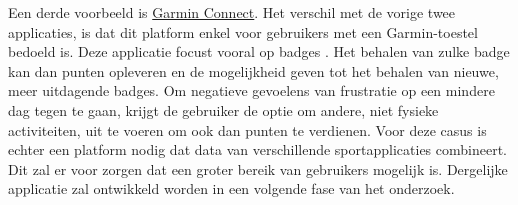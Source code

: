 Een derde voorbeeld is \href{https://connect.garmin.com/}{Garmin Connect}. Het verschil met de vorige twee applicaties, is dat dit platform enkel voor gebruikers met een Garmin-toestel bedoeld is. Deze applicatie focust vooral op badges \autocite{Ilhan2019}. Het behalen van zulke badge kan dan punten opleveren en de mogelijkheid geven tot het behalen van nieuwe, meer uitdagende badges. Om negatieve gevoelens van frustratie op een mindere dag tegen te gaan, krijgt de gebruiker de optie om andere, niet fysieke activiteiten, uit te voeren om ook dan punten te verdienen.
Voor deze casus is echter een platform nodig dat data van verschillende sportapplicaties combineert. Dit zal er voor zorgen dat een groter bereik van gebruikers mogelijk is. Dergelijke applicatie zal ontwikkeld worden in een volgende fase van het onderzoek.
